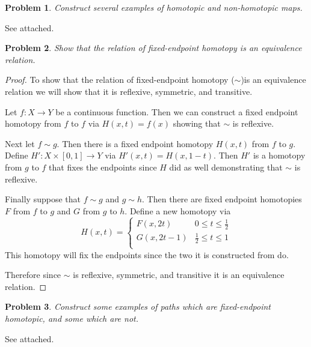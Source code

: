 \documentclass[10pt]{article}
\newcommand{\sk}{\vskip 10mm}
\theoremstyle{plain}
\newtheorem{problem}{Problem}
\theoremstyle{remark}
\begin{document}
\begin{problem} %
  Construct several examples of homotopic and non-homotopic maps.
\end{problem}

See attached.

\sk

\begin{problem} %
  Show that the relation of fixed-endpoint homotopy is an equivalence relation.
\end{problem}

\begin{proof}
  To show that the relation of fixed-endpoint homotopy ($\sim$)is an equivalence relation
  we will show that it is reflexive, symmetric, and transitive.

  Let $f:X\rightarrow Y$ be a continuous function. Then we can construct a fixed endpoint
  homotopy from $f$ to $f$ via $H(x,t)=f(x)$ showing that $\sim$ is reflexive.

  Next let $f\sim g$. Then there is a fixed endpoint homotopy $H(x,t)$ from $f$ to $g$.
  Define $H':X\times [0,1]\rightarrow Y$ via $H'(x,t)=H(x,1-t)$. Then $H'$ is a homotopy
  from $g$ to $f$ that fixes the endpoints since $H$ did as well demonstrating that
  $\sim$ is reflexive.

  Finally suppose that $f\sim g$ and $g\sim h$. Then there are fixed endpoint
  homotopies $F$ from $f$ to $g$ and $G$ from $g$ to $h$. Define a new homotopy
  via
  \[
    H(x,t) = \left\{
      \begin{array}{cc}
        F(x,2t) & 0\leq t\leq \frac{1}{2}\\
        G(x,2t-1) & \frac{1}{2}\leq t\leq 1\\
      \end{array}
      \right.
    \]
    This homotopy will fix the endpoints since the two it is constructed from do.

    Therefore since $\sim$ is reflexive, symmetric, and transitive it is an
    equivalence relation.
\end{proof}

\sk

\begin{problem} %
  Construct some examples of paths which are fixed-endpoint homotopic, and some
  which are not.
\end{problem}

See attached.

\sk
\end{document}

